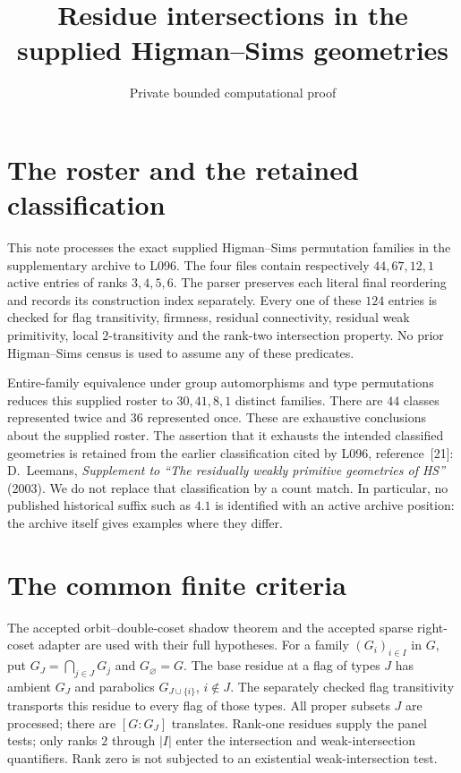 \documentclass[11pt]{article}
\title{Residue intersections in the supplied Higman--Sims geometries}
\author{Private bounded computational proof}
\date{}
\begin{document}
\maketitle
\section{The roster and the retained classification}
This note processes the exact supplied Higman--Sims permutation families
in the supplementary archive to L096. The four files contain respectively
$44,67,12,1$ active entries of ranks $3,4,5,6$. The parser preserves each
literal final reordering and records its construction index separately.
Every one of these $124$ entries is checked for flag transitivity,
firmness, residual connectivity, residual weak primitivity, local
$2$-transitivity and the rank-two intersection property. No prior
Higman--Sims census is used to assume any of these predicates.

Entire-family equivalence under group automorphisms and type permutations
reduces this supplied roster to $30,41,8,1$ distinct families. There are
$44$ classes represented twice and $36$ represented once. These are
exhaustive conclusions about the supplied roster. The assertion that it
exhausts the intended classified geometries is retained from the earlier
classification cited by L096, reference~[21]: D.~Leemans, \emph{Supplement
to ``The residually weakly primitive geometries of HS''} (2003).
We do not replace that classification by a count match. In particular,
no published historical suffix such as $4.1$ is identified with an active
archive position: the archive itself gives examples where they differ.

\section{The common finite criteria}
The accepted orbit--double-coset shadow theorem and the accepted sparse
right-coset adapter are used with their full hypotheses. For a family
$(G_i)_{i\in I}$ in $G$, put $G_J=\bigcap_{j\in J}G_j$ and
$G_\varnothing=G$. The base residue at a flag of types $J$ has ambient
$G_J$ and parabolics $G_{J\cup\{i\}}$, $i\notin J$. The separately
checked flag transitivity transports this residue to every flag of those
types. All proper subsets $J$ are processed; there are
$[G:G_J]$ translates. Rank-one residues supply the panel tests; only ranks
$2$ through $|I|$ enter the intersection and weak-intersection quantifiers.
Rank zero is not subjected to an existential weak-intersection test.
\end{document}
